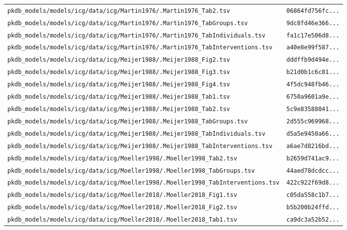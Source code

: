 \begin{longtable}{ll}
\texttt{pkdb\_models/models/icg/data/icg/Martin1976/.Martin1976\_Tab2.tsv} & \texttt{06864fd756fc...} \\
\texttt{pkdb\_models/models/icg/data/icg/Martin1976/.Martin1976\_TabGroups.tsv} & \texttt{9dc8fd46e366...} \\
\texttt{pkdb\_models/models/icg/data/icg/Martin1976/.Martin1976\_TabIndividuals.tsv} & \texttt{fa1c17e506d8...} \\
\texttt{pkdb\_models/models/icg/data/icg/Martin1976/.Martin1976\_TabInterventions.tsv} & \texttt{a40e8e99f587...} \\
\texttt{pkdb\_models/models/icg/data/icg/Meijer1988/.Meijer1988\_Fig2.tsv} & \texttt{dddffb9d494e...} \\
\texttt{pkdb\_models/models/icg/data/icg/Meijer1988/.Meijer1988\_Fig3.tsv} & \texttt{b21d0b1c6c81...} \\
\texttt{pkdb\_models/models/icg/data/icg/Meijer1988/.Meijer1988\_Fig4.tsv} & \texttt{4f5dc948fb46...} \\
\texttt{pkdb\_models/models/icg/data/icg/Meijer1988/.Meijer1988\_Tab1.tsv} & \texttt{6750a9601a9e...} \\
\texttt{pkdb\_models/models/icg/data/icg/Meijer1988/.Meijer1988\_Tab2.tsv} & \texttt{5c9e83588041...} \\
\texttt{pkdb\_models/models/icg/data/icg/Meijer1988/.Meijer1988\_TabGroups.tsv} & \texttt{2d555c969968...} \\
\texttt{pkdb\_models/models/icg/data/icg/Meijer1988/.Meijer1988\_TabIndividuals.tsv} & \texttt{d5a5e9450a66...} \\
\texttt{pkdb\_models/models/icg/data/icg/Meijer1988/.Meijer1988\_TabInterventions.tsv} & \texttt{a6ae7d8216bd...} \\
\texttt{pkdb\_models/models/icg/data/icg/Moeller1998/.Moeller1998\_Tab2.tsv} & \texttt{b2659d741ac9...} \\
\texttt{pkdb\_models/models/icg/data/icg/Moeller1998/.Moeller1998\_TabGroups.tsv} & \texttt{44aed78dcdcc...} \\
\texttt{pkdb\_models/models/icg/data/icg/Moeller1998/.Moeller1998\_TabInterventions.tsv} & \texttt{422c922f69d8...} \\
\texttt{pkdb\_models/models/icg/data/icg/Moeller2018/.Moeller2018\_Fig1.tsv} & \texttt{c05da558c1b7...} \\
\texttt{pkdb\_models/models/icg/data/icg/Moeller2018/.Moeller2018\_Fig2.tsv} & \texttt{b5b200b24ffd...} \\
\texttt{pkdb\_models/models/icg/data/icg/Moeller2018/.Moeller2018\_Tab1.tsv} & \texttt{ca9dc3a52b52...} \\

\end{longtable}
